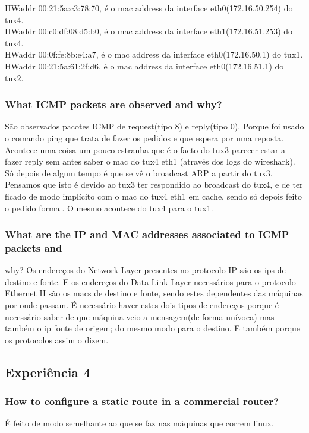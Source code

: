 \documentclass[a4paper]{article}
\begin{document}
\noindent HWaddr 00:21:5a:c3:78:70, é o mac address da interface eth0(172.16.50.254) do tux4.\\
HWaddr 00:c0:df:08:d5:b0, é o mac address da interface eth1(172.16.51.253) do tux4.\\
HWaddr 00:0f:fe:8b:e4:a7, é o mac address da interface eth0(172.16.50.1) do tux1.\\
HWaddr 00:21:5a:61:2f:d6, é o mac address da interface eth0(172.16.51.1) do tux2.

\subsubsection{What ICMP packets are observed and why?}
São observados pacotes ICMP de request(tipo 8) e reply(tipo 0). Porque foi usado o comando ping que trata de fazer os pedidos e que espera por uma reposta. Acontece uma coisa um pouco estranha que é o facto do tux3 parecer estar a fazer reply sem antes saber o mac do tux4 eth1 (através dos logs do wireshark). Só depois de algum tempo é que se vê o broadcast ARP a partir do tux3. Pensamos que isto é devido ao tux3 ter respondido ao broadcast do tux4, e de ter ficado de modo implícito com o mac do tux4 eth1 em cache, sendo só depois feito o pedido formal. O mesmo acontece do tux4 para o tux1.

\subsubsection{What are the IP and MAC addresses associated to ICMP packets and}
why?
Os endereços do Network Layer presentes no protocolo IP são os ips de destino e fonte. E os endereços do Data Link Layer necessários para o protocolo Ethernet II são os macs de destino e fonte, sendo estes dependentes das máquinas por onde passam. É necessário haver estes dois tipos de endereços porque é necessário saber de que máquina veio a mensagem(de forma unívoca) mas também o ip fonte de origem; do mesmo modo para o destino. E também porque os protocolos assim o dizem.
\subsection{Experiência 4}

\subsubsection{How to configure a static route in a commercial router?}
É feito de modo semelhante ao que se faz nas máquinas que correm linux.\\
\end{document}

